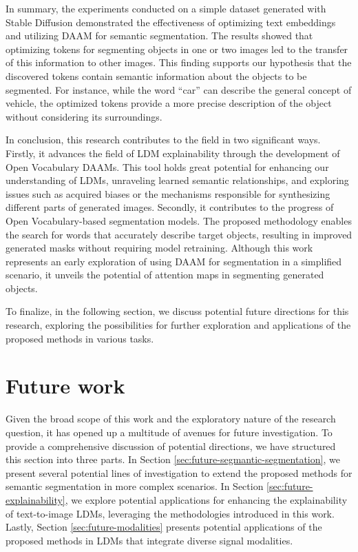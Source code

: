 In summary, the experiments conducted on a simple dataset generated with Stable Diffusion demonstrated the effectiveness of optimizing text embeddings and utilizing DAAM for semantic segmentation. The results showed that optimizing tokens for segmenting objects in one or two images led to the transfer of this information to other images. This finding supports our hypothesis that the discovered tokens contain semantic information about the objects to be segmented. For instance, while the word ``car'' can describe the general concept of vehicle, the optimized tokens provide a more precise description of the object without considering its surroundings.

In conclusion, this research contributes to the field in two significant ways. Firstly, it advances the field of LDM explainability through the development of Open Vocabulary DAAMs. This tool holds great potential for enhancing our understanding of LDMs, unraveling learned semantic relationships, and exploring issues such as acquired biases or the mechanisms responsible for synthesizing different parts of generated images. Secondly, it contributes to the progress of Open Vocabulary-based segmentation models. The proposed methodology enables the search for words that accurately describe target objects, resulting in improved generated masks without requiring model retraining. Although this work represents an early exploration of using DAAM for segmentation in a simplified scenario, it unveils the potential of attention maps in segmenting generated objects.

To finalize, in the following section, we discuss potential future directions for this research, exploring the possibilities for further exploration and applications of the proposed methods in various tasks.

\section{Future work}


Given the broad scope of this work and the exploratory nature of the research question, it has opened up a multitude of avenues for future investigation. To provide a comprehensive discussion of potential directions, we have structured this section into three parts. In Section \ref{sec:future-segmantic-segmentation}, we present several potential lines of investigation to extend the proposed methods for semantic segmentation in more complex scenarios. In Section \ref{sec:future-explainability}, we explore potential applications for enhancing the explainability of text-to-image LDMs, leveraging the methodologies introduced in this work. Lastly, Section \ref{sec:future-modalities} presents potential applications of the proposed methods in LDMs that integrate diverse signal modalities.


